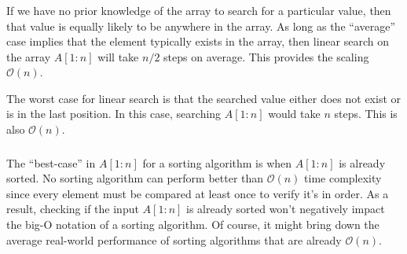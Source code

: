 \subsubsection{}
    If we have no prior knowledge of the array to search for a particular value, then that value is equally likely to be anywhere in the array.  As long as the ``average'' case implies that the element typically exists in the array, then linear search on the array $A[1:n]$ will take $n/2$ steps on average.  This provides the scaling $\mathcal O(n)$.

    The worst case for linear search is that the searched value either does not exist or is in the last position.  In this case, searching $A[1:n]$ would take $n$ steps.  This is also $\mathcal O(n)$.

\subsubsection{}
    The ``best-case'' in $A[1:n]$ for a sorting algorithm is when $A[1:n]$ is already sorted.  No sorting algorithm can perform better than $\mathcal O(n)$ time complexity since every element must be compared at least once to verify it's in order.  As a result, checking if the input $A[1:n]$ is already sorted won't negatively impact the big-O notation of a sorting algorithm.  Of course, it might bring down the average real-world performance of sorting algorithms that are already $\mathcal O(n)$.